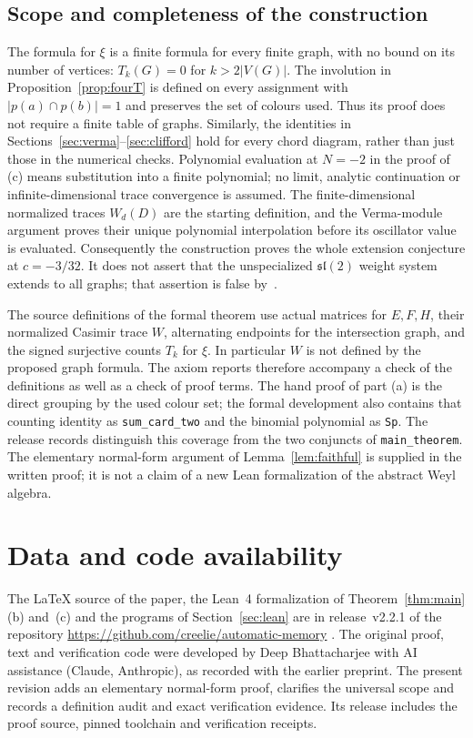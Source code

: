 \documentclass[preprint,12pt]{elsarticle}
\theoremstyle{definition}
\begin{document}
\subsection*{Scope and completeness of the construction}
The formula for $\xi$ is a finite formula for every finite graph, with no bound on its number of vertices: $T_k(G)=0$ for $k>2|V(G)|$. The involution in Proposition~\ref{prop:fourT} is defined on every assignment with $|p(a)\cap p(b)|=1$ and preserves the set of colours used. Thus its proof does not require a finite table of graphs. Similarly, the identities in Sections~\ref{sec:verma}--\ref{sec:clifford} hold for every chord diagram, rather than just those in the numerical checks. Polynomial evaluation at $N=-2$ in the proof of (c) means substitution into a finite polynomial; no limit, analytic continuation or infinite-dimensional trace convergence is assumed. The finite-dimensional normalized traces $W_d(D)$ are the starting definition, and the Verma-module argument proves their unique polynomial interpolation before its oscillator value is evaluated. Consequently the construction proves the whole extension conjecture at $c=-3/32$. It does not assert that the unspecialized $\mathfrak{sl}(2)$ weight system extends to all graphs; that assertion is false by~\cite{FKPU}.

The source definitions of the formal theorem use actual matrices for $E,F,H$, their normalized Casimir trace $W$, alternating endpoints for the intersection graph, and the signed surjective counts $T_k$ for $\xi$. In particular $W$ is not defined by the proposed graph formula. The axiom reports therefore accompany a check of the definitions as well as a check of proof terms. The hand proof of part (a) is the direct grouping by the used colour set; the formal development also contains that counting identity as \texttt{sum\_card\_two} and the binomial polynomial as \texttt{Sp}. The release records distinguish this coverage from the two conjuncts of \texttt{main\_theorem}. The elementary normal-form argument of Lemma~\ref{lem:faithful} is supplied in the written proof; it is not a claim of a new Lean formalization of the abstract Weyl algebra.

\section*{Data and code availability}
\begingroup\raggedright
The \LaTeX{} source of the paper, the Lean~4 formalization of Theorem~\ref{thm:main}(b) and~(c) and the programs of Section~\ref{sec:lean} are in release~v2.2.1 of the repository \url{https://github.com/creelie/automatic-memory} \cite{archive}. The original proof, text and verification code were developed by Deep Bhattacharjee with AI assistance (Claude, Anthropic), as recorded with the earlier preprint. The present revision adds an elementary normal-form proof, clarifies the universal scope and records a definition audit and exact verification evidence. Its release includes the proof source, pinned toolchain and verification receipts.\par
\endgroup
\end{document}
